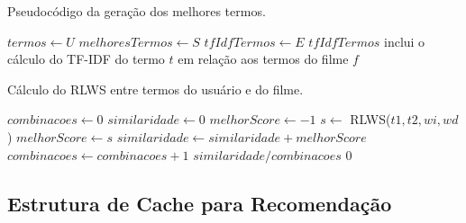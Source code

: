 \begin{algorithm}
\label{alg:alg_best_terms}
	\caption{Pseudocódigo da geração dos melhores termos.}
	\begin{algorithmic}[1]
            \State  $termos\gets U$
            \State  $melhoresTermos\gets S$
            \State  $tfIdfTermos\gets E$
                    \State $tfIdfTermos$ {inclui o cálculo do TF-IDF do termo $t$ em relação aos termos do filme $f$}
                \EndFor
            \EndFor
        \EndFunction
    \end{algorithmic}
\end{algorithm}

\begin{algorithm}
	\caption{Cálculo do RLWS entre termos do usuário e do filme.}
	\begin{algorithmic}[1]
        	\State $combinacoes\gets 0$
        	\State $similaridade\gets 0$
        		\State $melhorScore\gets -1$
        			\State $s\gets$ RLWS($t1, t2, wi, wd$)
        				$melhorScore\gets s$
        			\EndIf
        		\EndFor
        			$similaridade\gets similaridade + melhorScore$
        			$combinacoes\gets combinacoes + 1$
        		\EndIf        		      	
        	\EndFor
				\Return $similaridade / combinacoes$
			\Else
				\Return $0$
			\EndIf
        \EndFunction
    \end{algorithmic}
\end{algorithm}

\label{ssec:cache}
\subsection{Estrutura de Cache para Recomendação}

